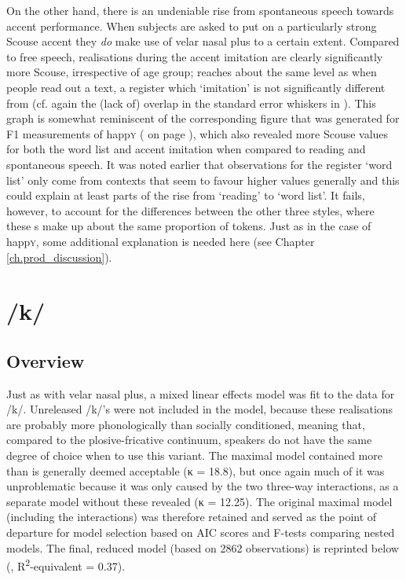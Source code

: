 On the other hand, there is an undeniable rise from spontaneous speech towards accent performance.
When subjects are asked to put on a particularly strong Scouse accent they \emph{do} make use of velar nasal plus to a certain extent.
Compared to free speech, realisations during the accent imitation are clearly significantly more Scouse, irrespective of age group;  reaches about the same level as when people read out a text, a register which `imitation' is not significantly different from (cf. again the (lack of) overlap in the standard error whiskers in ).
This graph is somewhat reminiscent of the corresponding figure that was generated for F1 measurements of happ\textsc{y} ( on page \pageref{fig.line.f1w.happy.tot}), which also revealed more Scouse values for both the word list and accent imitation when compared to reading and spontaneous speech.
It was noted earlier that observations for the register `word list' only come from contexts that seem to favour higher  values generally and this could explain at least parts of the rise from `reading' to `word list'.
It fails, however, to account for the differences between the other three styles, where these s make up about the same proportion of tokens.
Just as in the case of happ\textsc{y}, some additional explanation is needed here (see Chapter \ref{ch.prod_discussion}).

\section{/k/}
\label{prod.res.con.k}

\subsection{Overview}
\label{sec.prod.res.con.k.overview}

Just as with velar nasal plus, a mixed linear effects model was fit to the data for /k/.
Unreleased /k/'s were not included in the model, because these realisations are probably more phonologically than socially conditioned, meaning that, compared to the plosive-fricative continuum, speakers do not have the same degree of choice when to use this variant.
The maximal model contained more  than is generally deemed acceptable (κ = 18.8), but once again much of it was unproblematic because it was only caused by the two three-way interactions, as a separate model without these revealed (κ = 12.25).
The original maximal model (including the interactions) was therefore retained and served as the point of departure for model selection based on AIC scores and F-tests comparing nested models.
The final, reduced model (based on 2862 observations) is reprinted below (, R\textsuperscript{2}-equivalent = 0.37).

